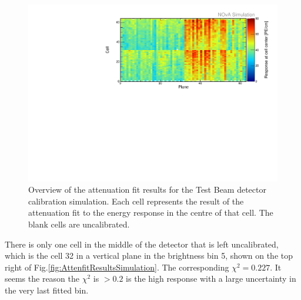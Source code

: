 \begin{figure}[h]
\centering
\includegraphics[width=\textwidth]{PlotsTBCalibTechnote/CellResponseAtCentre_Prod4DataBasedSim_Limited_NOvAPlotStyle.pdf}
\caption{Overview of the attenuation fit results for the Test Beam detector calibration simulation. Each cell represents the result of the attenuation fit to the energy response in the centre of that cell. The blank cells are uncalibrated.}
\label{fig:CellCentreResponseSim}
\end{figure}

There is only one cell in the middle of the detector that is left uncalibrated, which is the cell 32 in a vertical plane in the brightness bin 5, shown on the top right of Fig.\ref{fig:AttenfitResultsSimulation}. The corresponding $\chi^2=0.227$. It seems the reason the $\chi^2$ is $>0.2$ is the high response with a large uncertainty in the very last fitted bin.

